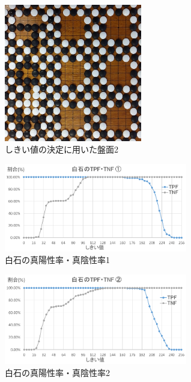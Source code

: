 \documentclass[openright]{nitocs}
\numberwithin{equation}{section}
\begin{document}
            \begin{figure}[tb] %
                \begin{center}
                \includegraphics[clip,width=60mm]{DSC_0100/boardImg.jpg} 
                \caption{しきい値の決定に用いた盤面2}
                \label{DSC0100}
                \end{center}
            \end{figure}

            \begin{figure}[tb] %
                \begin{center}
                \includegraphics[clip,width=80mm]{Case1_White_TPF_TNF.eps} 
                \caption{白石の真陽性率・真陰性率1}
                \label{Case1White}
                \end{center}
            \end{figure}
            
            \begin{figure}[tb] %
                \begin{center}
                \includegraphics[clip,width=80mm]{Case2_White_TPF_TNF.eps} 
                \caption{白石の真陽性率・真陰性率2}
                \label{Case2White}
                \end{center}
            \end{figure}
\end{document}
